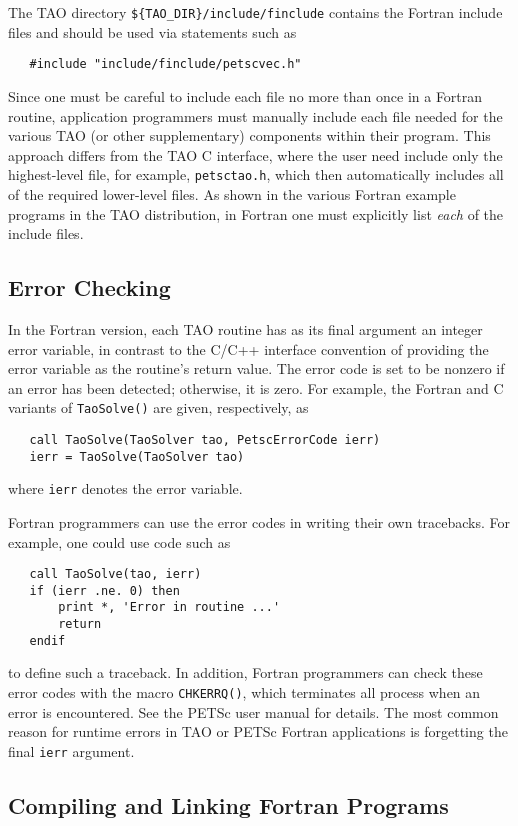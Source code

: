 The TAO directory {\tt \$\{TAO\_DIR\}/include/finclude}
contains the Fortran include files
and should be used via statements 
such as 
\begin{verbatim}
   #include "include/finclude/petscvec.h"
\end{verbatim}
Since one must be careful to include each file no more than once
in a Fortran routine, application programmers must manually include
each file needed for the various TAO (or other supplementary)
components within their program.  This approach differs from the TAO
C interface, where the user need include only the highest-level
file, for example, {\tt petsctao.h}, which then automatically
includes all of the required lower-level files.  As shown in the
various Fortran example programs in the TAO distribution, in Fortran
one must explicitly list {\em each} of the include files.


\subsection{Error Checking}
\label{sec:fortran_errors}

In the Fortran version, each TAO routine has as its final argument
an integer error variable, in contrast to the C/C++ interface convention 
of providing the error variable as the routine's return value.  The error
code is set to be nonzero if an error has been detected; otherwise, it
is zero.  For example, the Fortran and C variants of {\tt TaoSolve()} are
given, respectively, as 
\begin{verbatim}
   call TaoSolve(TaoSolver tao, PetscErrorCode ierr)
   ierr = TaoSolve(TaoSolver tao)
\end{verbatim}
where {\tt ierr} denotes the error variable.

Fortran programmers can use the error codes in writing their own
tracebacks.  For example, one could use code such as 
\begin{verbatim}
   call TaoSolve(tao, ierr)
   if (ierr .ne. 0) then
       print *, 'Error in routine ...'
       return
   endif
\end{verbatim}
to define such a traceback. 
In addition, Fortran programmers can check these error codes with the
macro {\tt CHKERRQ()}, which terminates all process when an error
is encountered.  See the PETSc user manual for details.  The most
common reason for runtime errors in TAO or PETSc Fortran applications is 
forgetting 
the final {\tt ierr} argument.

\subsection{Compiling and Linking Fortran Programs}
\label{sec:fortcompile}

